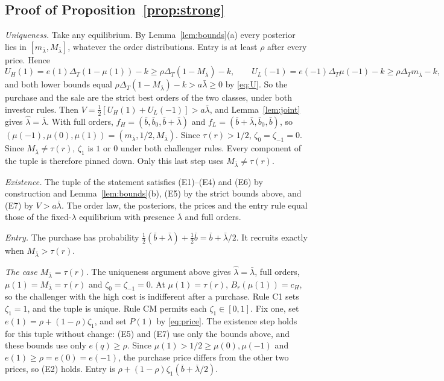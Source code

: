\documentclass[12pt]{article}
\theoremstyle{definition}
\theoremstyle{remark}
\newcommand{\DT}{\Delta_T}
\newcommand{\lh}{\hat\lambda}
\newcommand{\lb}{\bar\lambda}
\begin{document}
\subsection{Proof of Proposition~\ref{prop:strong}}

\emph{Uniqueness.} Take any equilibrium. By Lemma~\ref{lem:bounds}(a) every posterior lies in
$[m_{\lb},M_{\lb}]$, whatever the order distributions. Entry is at least $\rho$ after every price. Hence
\[
U_H(1)=e(1)\DT(1-\mu(1))-k\ge\rho\DT(1-M_{\lb})-k,\qquad U_L(-1)=e(-1)\DT\mu(-1)-k\ge\rho\DT m_{\lb}-k ,
\]
and both lower bounds equal $\rho\DT(1-M_{\lb})-k>a\lb\ge0$ by \eqref{eq:U}. So the purchase and the sale are the
strict best orders of the two classes, under both investor rules. Then $V=\frac12[U_H(1)+U_L(-1)]>a\lb$, and
Lemma~\ref{lem:joint} gives $\lh=\lb$. With full orders, $f_H=(\bar b,\bar b_0,\bar b+\lb)$ and
$f_L=(\bar b+\lb,\bar b_0,\bar b)$, so $(\mu(-1),\mu(0),\mu(1))=(m_{\lb},1/2,M_{\lb})$. Since $\tau(r)>1/2$,
$\zeta_0=\zeta_{-1}=0$. Since $M_{\lb}\neq\tau(r)$, $\zeta_1$ is $1$ or $0$ under both challenger rules. Every
component of the tuple is therefore pinned down. Only this last step uses $M_{\lb}\neq\tau(r)$.

\emph{Existence.} The tuple of the statement satisfies (E1)--(E4) and (E6) by construction and
Lemma~\ref{lem:bounds}(b), (E5) by the strict bounds above, and (E7) by $V>a\lb$. The order law, the posteriors, the prices and the entry rule
equal those of the fixed-$\lambda$ equilibrium with presence $\lb$ and full orders.

\emph{Entry.} The purchase has probability $\frac12(\bar b+\lb)+\frac12\bar b=\bar b+\lb/2$. It recruits exactly
when $M_{\lb}>\tau(r)$.

\emph{The case $M_{\lb}=\tau(r)$.} The uniqueness argument above gives $\lh=\lb$, full orders,
$\mu(1)=M_{\lb}=\tau(r)$ and $\zeta_0=\zeta_{-1}=0$. At $\mu(1)=\tau(r)$, $B_r(\mu(1))=c_H$, so the challenger with the
high cost is indifferent after a purchase. Rule C1 sets $\zeta_1=1$, and the tuple is unique. Rule CM permits each
$\zeta_1\in[0,1]$. Fix one, set $e(1)=\rho+(1-\rho)\zeta_1$, and set $P(1)$ by \eqref{eq:price}. The existence step
holds for this tuple without change: (E5) and (E7) use only the bounds above, and these bounds use only
$e(q)\ge\rho$. Since $\mu(1)>1/2\ge\mu(0),\mu(-1)$ and $e(1)\ge\rho=e(0)=e(-1)$, the purchase price differs from the
other two prices, so (E2) holds. Entry is $\rho+(1-\rho)\zeta_1(\bar b+\lb/2)$.
\end{document}
